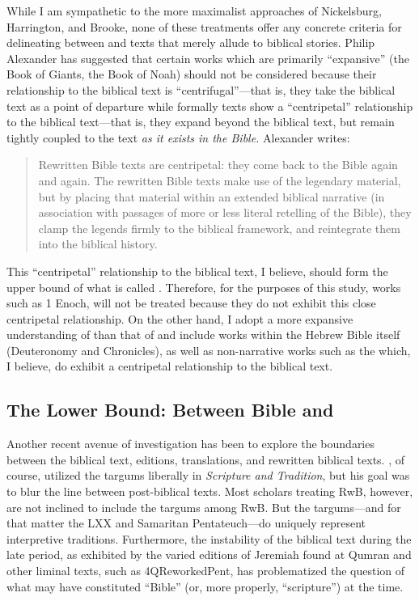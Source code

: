 While I am sympathetic to the more maximalist approaches of Nickelsburg, Harrington, and Brooke, none of these treatments offer any concrete criteria for delineating between \rwb and texts that merely allude to biblical stories. Philip Alexander has suggested that certain works which are primarily ``expansive'' (the Book of Giants, the Book of Noah) should not be considered \rwb because their relationship to the biblical text is ``centrifugal''---that is, they take the biblical text as a point of departure while formally \rwb texts show a ``centripetal'' relationship to the biblical text---that is, they expand beyond the biblical text, but remain tightly coupled to the text \emph{as it exists in the Bible.} Alexander writes: 

\begin{quote}
    Rewritten Bible texts are centripetal: they come back to the Bible again and again. The rewritten Bible texts make use of the legendary material, but by placing that material within an extended biblical narrative (in association with passages of more or less literal retelling of the Bible), they clamp the legends firmly to the biblical framework, and reintegrate them into the biblical history. \autocite[117]{alexander_carson-williamson1988}
\end{quote} 

This ``centripetal'' relationship to the biblical text, I believe, should form the upper bound of what is called \rwb. Therefore, for the purposes of this study, works such as 1 Enoch, will not be treated because they do not exhibit this close centripetal relationship. On the other hand, I adopt a more expansive understanding of \rwb than that of \vermes and include works within the Hebrew Bible itself (Deuteronomy and Chronicles), as well as non-narrative works such as the \templescroll which, I believe, do exhibit a centripetal relationship to the biblical text. 

\subsection{The Lower Bound: Between Bible and \RWB}

Another recent avenue of investigation has been to explore the boundaries between the biblical text, editions, translations, and rewritten biblical texts. \vermes, of course, utilized the targums liberally in \emph{Scripture and Tradition}, but his goal was to blur the line between post-biblical texts. Most scholars treating RwB, however, are not inclined to include the targums among RwB. But the targums---and for that matter the LXX and Samaritan Pentateuch---do uniquely represent interpretive traditions. Furthermore, the instability of the biblical text during the late \secondtemple period, as exhibited by the varied editions of Jeremiah found at Qumran and other liminal texts, such as 4QReworkedPent, has problematized the question of what may have constituted ``Bible'' (or, more properly, ``scripture'') at the time. 

